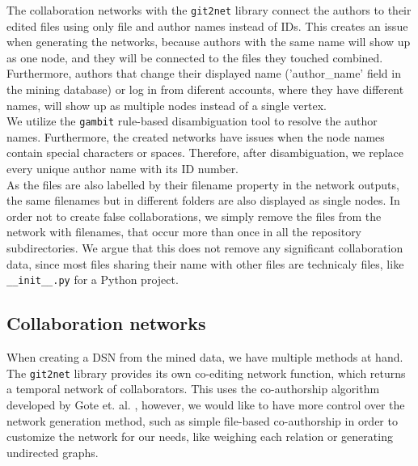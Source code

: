 The collaboration networks with the \texttt{git2net} library connect the authors to their edited files using only file and author names instead of IDs. This creates an issue when generating the networks, because authors with the same name will show up as one node, and they will be connected to the files they touched combined. Furthermore, authors that change their displayed name ('author\_name' field in the mining database) or log in from diferent accounts, where they have different names, will show up as multiple nodes instead of a single vertex. \\

We utilize the \texttt{gambit} \cite{goteGambitOpenSource2021} rule-based disambiguation tool to resolve the author names. Furthermore, the created networks have issues when the node names contain special characters or spaces. Therefore, after disambiguation, we replace every unique author name with its ID number. \\

As the files are also labelled by their filename property in the network outputs, the same filenames but in different folders are also displayed as single nodes. In order not to create false collaborations, we simply remove the files from the network with filenames, that occur more than once in all the repository subdirectories. We argue that this does not remove any significant collaboration data, since most files sharing their name with other files are technicaly files, like \texttt{\_\_init\_\_.py} for a Python project. \\

\subsection{Collaboration networks}

When creating a DSN from the mined data, we have multiple methods at hand. The \texttt{git2net} library provides its own co-editing network function, which returns a temporal network of collaborators. This uses the co-authorship algorithm developed by Gote et. al. \cite{goteAnalysingTimeStampedCoEditing2019}, however, we would like to have more control over the network generation method, such as simple file-based co-authorship in order to customize the network for our needs, like weighing each relation or generating undirected graphs. \\

